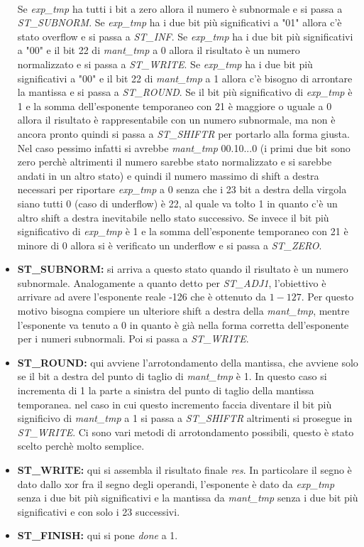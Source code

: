 \documentclass[]{IEEEtran}
\begin{document}
\begin{itemize}
    \\Se \textit{exp\_tmp} ha tutti i bit a zero allora il numero è subnormale e si passa a \textit{ST\_SUBNORM}. Se \textit{exp\_tmp} ha i due bit più significativi a "01" allora c'è stato overflow e si passa a \textit{ST\_INF}. Se \textit{exp\_tmp} ha i due bit più significativi a "00" e il bit 22 di \textit{mant\_tmp} a 0 allora il risultato è un numero normalizzato e si passa a \textit{ST\_WRITE}. Se \textit{exp\_tmp} ha i due bit più significativi a "00" e il bit 22 di \textit{mant\_tmp} a 1 allora c'è bisogno di arrontare la mantissa e si passa a \textit{ST\_ROUND}. Se il bit più significativo di \textit{exp\_tmp} è 1 e la somma dell'esponente temporaneo con 21 è maggiore o uguale a 0 allora il risultato è rappresentabile con un numero subnormale, ma non è ancora pronto quindi si passa a \textit{ST\_SHIFTR} per portarlo alla forma giusta. Nel caso pessimo infatti si avrebbe \textit{mant\_tmp} 00.10...0 (i primi due bit sono zero perchè altrimenti il numero sarebbe stato normalizzato e si sarebbe andati in un altro stato) e quindi il numero massimo di shift a destra necessari per riportare \textit{exp\_tmp} a 0 senza che i 23 bit a destra della virgola siano tutti 0 (caso di underflow) è 22, al quale va tolto 1 in quanto c'è un altro shift a destra inevitabile nello stato successivo. Se invece il bit più significativo di \textit{exp\_tmp} è 1 e la somma dell'esponente temporaneo con 21 è minore di 0 allora si è verificato un underflow e si passa a \textit{ST\_ZERO}.
    \item \textbf{ST\_SUBNORM:} si arriva a questo stato quando il risultato è un numero subnormale. Analogamente a quanto detto per \textit{ST\_ADJ1}, l'obiettivo è arrivare ad avere l'esponente reale -126 che è ottenuto da $1 - 127$. Per questo motivo bisogna compiere un ulteriore shift a destra della \textit{mant\_tmp}, mentre l'esponente va tenuto a 0 in quanto è già nella forma corretta dell'esponente per i numeri subnormali. Poi si passa a \textit{ST\_WRITE}.
    \item \textbf{ST\_ROUND:} qui avviene l'arrotondamento della mantissa, che avviene solo se il bit a destra del punto di taglio di \textit{mant\_tmp} è 1. In questo caso si incrementa di 1 la parte a sinistra del punto di taglio della mantissa temporanea. nel caso in cui questo incremento faccia diventare il bit più significivo di \textit{mant\_tmp} a 1 si passa a \textit{ST\_SHIFTR} altrimenti si prosegue in \textit{ST\_WRITE}. Ci sono vari metodi di arrotondamento possibili, questo è stato scelto perchè molto semplice.
    \item \textbf{ST\_WRITE:} qui si assembla il risultato finale \textit{res}. In particolare il segno è dato dallo xor fra il segno degli operandi, l'esponente è dato da \textit{exp\_tmp} senza i due bit più significativi e la mantissa da \textit{mant\_tmp} senza i due bit più significativi e con solo i 23 successivi.
    \item \textbf{ST\_FINISH:} qui si pone \textit{done} a 1.
\end{itemize}
\end{document}
